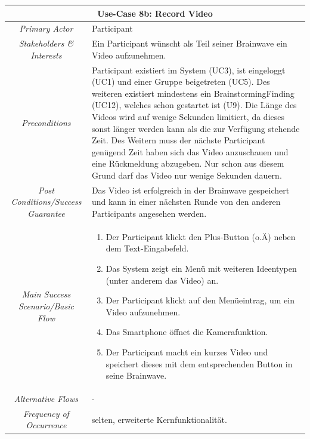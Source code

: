 \renewcommand{\arraystretch}{1.35}
\begin{center}
	\begin{longtable}{| c | p{7cm} |}
		\hline
		\multicolumn{2}{|c|}{\textbf{Use-Case 8b: Record Video}}\\
		\hline\hline
		\textit{Primary Actor} & Participant\\
		\hline
		\textit{Stakeholders \& Interests} & Ein Participant wünscht als Teil seiner Brainwave ein Video aufzunehmen. \\
		\hline
		\textit{Preconditions} & Participant existiert im System (UC3), ist eingeloggt (UC1) und einer Gruppe beigetreten (UC5). Des weiteren existiert mindestens ein BrainstormingFinding (UC12), welches schon gestartet ist (U9). Die Länge des Videos wird auf wenige Sekunden limitiert, da dieses sonst länger werden kann als die zur Verfügung stehende Zeit. Des Weitern muss der nächste Participant genügend Zeit haben sich das Video anzuschauen und eine Rückmeldung abzugeben. Nur schon aus diesem Grund darf das Video nur wenige Sekunden dauern.\\
		\hline
		\textit{Post Conditions/Success Guarantee} & Das Video ist erfolgreich in der Brainwave gespeichert und kann in einer nächsten Runde von den anderen Participants angesehen werden.\\
		\hline
		\textit{Main Success Scenario/Basic Flow} & 
		\begin{enumerate}[noitemsep]
			\item Der Participant klickt den Plus-Button (o.Ä) neben dem Text-Eingabefeld.
			\item Das System zeigt ein Menü mit weiteren Ideentypen (unter anderem das Video) an.
			\item Der Participant klickt auf den Menüeintrag, um ein Video aufzunehmen.
			\item Das Smartphone öffnet die Kamerafunktion.
			\item Der Participant macht ein kurzes Video und speichert dieses mit dem entsprechenden Button in seine Brainwave.
		\end{enumerate}\\
		\hline
		\textit{Alternative Flows} &
		-\\
		\hline
		\textit{Frequency of Occurrence} & selten, erweiterte Kernfunktionalität.\\
		\hline
	\end{longtable}
\end{center}



